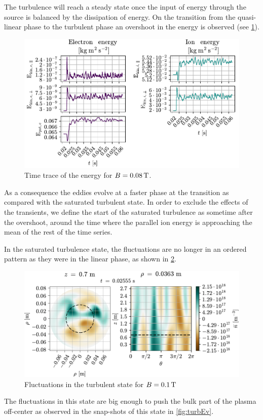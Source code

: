 The turbulence will reach a steady state once the input of energy through the source is balanced by the dissipation of energy.
On the transition from the quasi-linear phase to the turbulent phase an overshoot in the energy is observed (see \cref{fig:energyTrace008}).
%
\begin{figure}[htb]
    \centering
    \includegraphics{fig/results/energyTrace/energyTraceB008}
    \caption{Time trace of the energy for $B=0.08\, \text{T}$.}
    \label{fig:energyTrace008}
\end{figure}
%
As a consequence the eddies evolve at a faster phase at the transition as compared with the saturated turbulent state.
In order to exclude the effects of the transients, we define the start of the saturated turbulence as sometime after the overshoot, around the time where the parallel ion energy is approaching the mean of the rest of the time series.

In the saturated turbulence state, the fluctuations are no longer in an ordered pattern as they were in the linear phase, as shown in \cref{fig:2DFluct}.
%
\begin{figure}[htb]
    \centering
    \includegraphics{fig/results/2DTurbulence/fluct}
    \caption{Fluctuations in the turbulent state for $B=0.1\, \text{T}$}
    \label{fig:2DFluct}
\end{figure}
%
The fluctuations in this state are big enough to push the bulk part of the plasma off-center as observed in the snap-shots of this state in \cref{fig:turbEv}.

